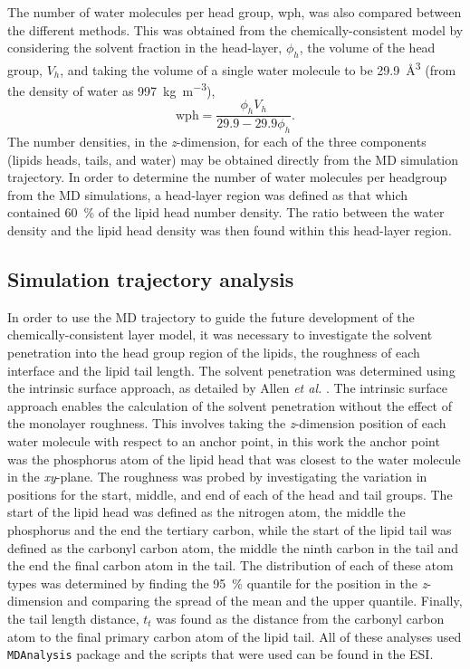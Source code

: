 \documentclass[amsmath,amssymb,twocolumn,superscriptaddress]{revtex4-1}
\begin{document}
The number of water molecules per head group, wph, was also compared between the different methods.
This was obtained from the chemically-consistent model by considering the solvent fraction in the head-layer, $\phi_h$, the volume of the head group, $V_h$, and taking the volume of a single water molecule to be \SI{29.9}{\cubic\angstrom} (from the density of water as
\SI{997}{\kilo\gram\per\cubic\meter}),
%
\begin{equation}
  \text{wph} = \frac{\phi_hV_h}{29.9 - 29.9\phi_h}.
  \label{equ:wph}
\end{equation}
%
The number densities, in the \emph{z}-dimension, for each of the three components (lipids heads, tails, and water) may be obtained directly from the MD simulation trajectory.
In order to determine the number of water molecules per headgroup from the MD simulations, a head-layer region was defined as that which contained \SI{60}{\percent} of the lipid head number density.
The ratio between the water density and the lipid head density was then found within this head-layer region.

\subsection{Simulation trajectory analysis}
\label{sec:traj}
In order to use the MD trajectory to guide the future development of the chemically-consistent layer model, it was necessary to investigate the solvent penetration into the head group region of the lipids, the roughness of each interface and the lipid tail length.
The solvent penetration was determined using the intrinsic surface approach, as detailed by Allen \emph{et al.} \cite{allen_specific_2016,pandit_algorithm_2003}.
The intrinsic surface approach enables the calculation of the solvent penetration without the effect of the monolayer roughness.
This involves taking the \emph{z}-dimension position of each water molecule with respect to an anchor point, in this work the anchor point was the phosphorus atom of the lipid head that was closest to the water molecule in the \emph{xy}-plane.
The roughness was probed by investigating the variation in positions for the start, middle, and end of each of the head and tail groups.
The start of the lipid head was defined as the nitrogen atom, the middle the phosphorus and the end the tertiary carbon, while the start of the lipid tail was defined as the carbonyl carbon atom, the middle the ninth carbon in the tail and the end the final carbon atom in the tail.
The distribution of each of these atom types was determined by finding the \SI{95}{\percent} quantile for the position in the \emph{z}-dimension and comparing the spread of the mean and the upper quantile.
Finally, the tail length distance, $t_t$ was found as the distance from the carbonyl carbon atom to the final primary carbon atom of the lipid tail.
All of these analyses used \texttt{MDAnalysis} package \cite{gowers_mdanalysis_2016,michaud-agrawal_mdanalysis_2011} and the scripts that were used can be found in the ESI.
\end{document}
